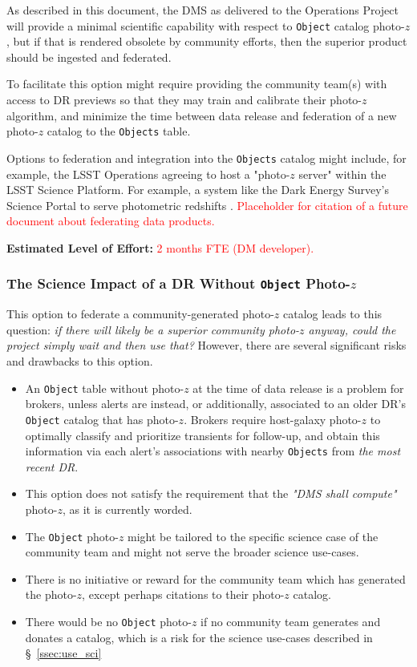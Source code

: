 \documentclass[DM,lsstdraft,toc]{lsstdoc}
\begin{document}
As described in this document, the DMS as delivered to the Operations Project will provide a minimal scientific capability with respect to {\tt Object} catalog photo-$z$, but if that is rendered obsolete by community efforts, then the superior product should be ingested and federated.

To facilitate this option might require providing the community team(s) with access to DR previews so that they may train and calibrate their photo-$z$ algorithm, and minimize the time between data release and federation of a new photo-$z$ catalog to the {\tt Objects} table.

Options to federation and integration into the {\tt Objects} catalog might include, for example, the LSST Operations agreeing to host a "photo-$z$ server" within the LSST Science Platform. For example, a system like the Dark Energy Survey's Science Portal to serve photometric redshifts \cite{2018A&C....25...58G}. \textcolor{red}{Placeholder for citation of a future document about federating data products.}

{\bf Estimated Level of Effort:} \textcolor{red}{2 months FTE (DM developer).}

\subsubsection{The Science Impact of a DR Without {\tt Object} Photo-$z$}

This option to federate a community-generated photo-$z$ catalog leads to this question: {\it if there will likely be a superior community photo-$z$ anyway, could the project simply wait and then use that?} However, there are several significant risks and drawbacks to this option.

\begin{itemize}
\item An {\tt Object} table without photo-$z$ at the time of data release is a problem for brokers, unless alerts are instead, or additionally, associated to an older DR's {\tt Object} catalog that has photo-$z$. Brokers require host-galaxy photo-$z$ to optimally classify and prioritize transients for follow-up, and obtain this information via each alert's associations with nearby {\tt Objects} from {\it the most recent DR}.
\item This option does not satisfy the requirement that the {\it "DMS shall compute"} photo-$z$, as it is currently worded.
\item The {\tt Object} photo-$z$ might be tailored to the specific science case of the community team and might not serve the broader science use-cases.
\item There is no initiative or reward for the community team which has generated the photo-$z$, except perhaps citations to their photo-$z$ catalog.
\item There would be no {\tt Object} photo-$z$ if no community team generates and donates a catalog, which is a risk for the science use-cases described in \S~\ref{ssec:use_sci}
\end{itemize}
\end{document}
